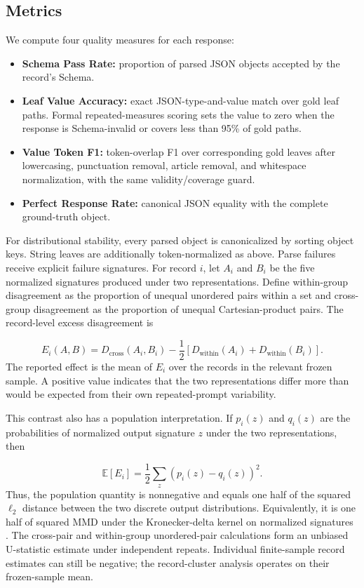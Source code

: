 \documentclass[10pt]{article}
\begin{document}
\subsection{Metrics}
We compute four quality measures for each response:

\begin{itemize}
\item \textbf{Schema Pass Rate:} proportion of parsed JSON objects accepted by the record's Schema.
\item \textbf{Leaf Value Accuracy:} exact JSON-type-and-value match over gold leaf paths. Formal repeated-measures scoring sets the value to zero when the response is Schema-invalid or covers less than 95\% of gold paths.
\item \textbf{Value Token F1:} token-overlap F1 over corresponding gold leaves after lowercasing, punctuation removal, article removal, and whitespace normalization, with the same validity/coverage guard.
\item \textbf{Perfect Response Rate:} canonical JSON equality with the complete ground-truth object.
\end{itemize}
For distributional stability, every parsed object is canonicalized by sorting object keys. String leaves are additionally token-normalized as above. Parse failures receive explicit failure signatures. For record \(i\), let \(A_i\) and \(B_i\) be the five normalized signatures produced under two representations. Define within-group disagreement as the proportion of unequal unordered pairs within a set and cross-group disagreement as the proportion of unequal Cartesian-product pairs. The record-level excess disagreement is

\[
E_i(A,B)=D_{\mathrm{cross}}(A_i,B_i)-\frac{1}{2}\left[D_{\mathrm{within}}(A_i)+D_{\mathrm{within}}(B_i)\right].
\]
The reported effect is the mean of \(E_i\) over the records in the relevant frozen sample. A positive value indicates that the two representations differ more than would be expected from their own repeated-prompt variability.

This contrast also has a population interpretation. If \(p_i(z)\) and \(q_i(z)\) are the probabilities of normalized output signature \(z\) under the two representations, then

\[
\mathbb{E}[E_i]=\frac{1}{2}\sum_z\left(p_i(z)-q_i(z)\right)^2.
\]
Thus, the population quantity is nonnegative and equals one half of the squared \(\ell_2\) distance between the two discrete output distributions. Equivalently, it is one half of squared MMD under the Kronecker-delta kernel on normalized signatures \citep{gretton2012kernel}. The cross-pair and within-group unordered-pair calculations form an unbiased U-statistic estimate under independent repeats. Individual finite-sample record estimates can still be negative; the record-cluster analysis operates on their frozen-sample mean.
\end{document}
